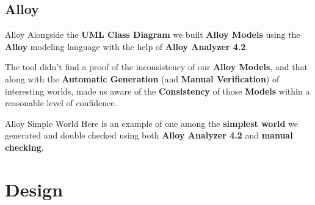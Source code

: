 \documentclass{../common/latex_classes/pdf_presentation}
\begin{document}
	\subsection{Alloy}
	\begin{frame}{Alloy}
		Alongside the \textbf{UML Class Diagram} we built \textbf{Alloy Models} using the \textbf{Alloy} modeling language with the help of \textbf{Alloy Analyzer 4.2}.\par
		The tool didn't find a proof of the inconsistency of our \textbf{Alloy Models}, and that along with the \textbf{Automatic Generation} (and \textbf{Manual Verification}) of interesting worlds, made us aware of the \textbf{Consistency} of those \textbf{Models} within a reasonable level of confidence.
	\end{frame}
	\begin{frame}{Alloy Simple World}
		Here is an example of one among the \textbf{simplest world} we generated and double checked using both \textbf{Alloy Analyzer 4.2} and \textbf{manual checking}.
	\end{frame}
	\section{Design}
\end{document}
